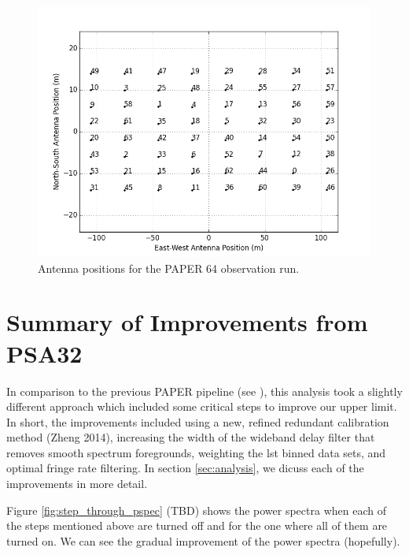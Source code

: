 \documentclass[twocolumn,numberedappendix]{emulateapj}
\begin{document}
\begin{figure}[!t]\centering
\includegraphics[width=1.85\columnwidth,height=\columnwidth]{plots/antenna_positions.png}
\caption{Antenna positions for the PAPER 64 observation run.}
\label{fig:antenna_positions}
\end{figure}

\section{Summary of Improvements from PSA32}
In comparison to the previous PAPER pipeline (see \cite{parsons_et_al2014a}),
this analysis took a slightly different approach which included some critical
steps to improve our upper limit. In short, the improvements included using a
new, refined redundant calibration method (Zheng 2014), increasing the width of
the wideband delay filter that removes smooth spectrum foregrounds, weighting
the lst binned data sets, and optimal fringe rate filtering. In section
\ref{sec:analysis}, we dicuss each of the improvements in more detail.

Figure \ref{fig:step_through_pspec} (TBD) shows the power spectra when each of
the steps mentioned above are turned off and for the one where all of them are
turned on. We can see the gradual improvement of the power spectra (hopefully).
\end{document}
